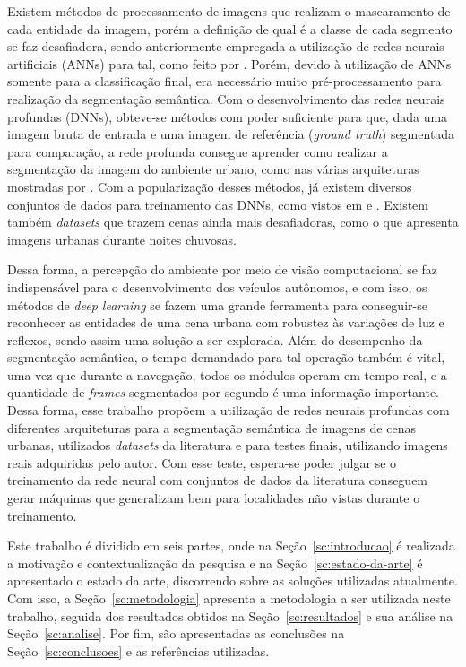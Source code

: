 \documentclass[conference]{IEEEtran}
\begin{document}
Existem métodos de processamento de imagens que realizam o mascaramento de cada entidade da imagem, porém a definição de qual é a classe de cada segmento se faz desafiadora, sendo anteriormente empregada a utilização de redes neurais artificiais (ANNs) para tal, como feito por \cite{vitor20132D3DVision}. Porém, devido à utilização de ANNs somente para a classificação final, era necessário muito pré-processamento para realização da segmentação semântica. Com o desenvolvimento das redes neurais profundas (DNNs), obteve-se métodos com poder suficiente para que, dada uma imagem bruta de entrada e uma imagem de referência (\textit{ground truth}) segmentada para comparação, a rede profunda consegue aprender como realizar a segmentação da imagem do ambiente urbano, como nas várias arquiteturas mostradas por \cite{papadeas2021RealTimeSemanticImage}. Com a popularização desses métodos, já existem diversos conjuntos de dados para treinamento das DNNs, como vistos em \cite{cordts2016CityscapesDatasetSemantic} e \cite{brostow2008SegmentationRecognitionUsing,brostow2009SemanticObjectClasses}. Existem também \textit{datasets} que trazem cenas ainda mais desafiadoras, como o \cite{jin2021RaidaRRichAnnotated} que apresenta imagens urbanas durante noites chuvosas.

Dessa forma, a percepção do ambiente por meio de visão computacional se faz indispensável para o desenvolvimento dos veículos autônomos, e com isso, os métodos de \textit{deep learning} se fazem uma grande ferramenta para conseguir-se reconhecer as entidades de uma cena urbana com robustez às variações de luz e reflexos, sendo assim uma solução a ser explorada. Além do desempenho da segmentação semântica, o tempo demandado para tal operação também é vital, uma vez que durante a navegação, todos os módulos operam em tempo real, e a quantidade de \textit{frames} segmentados por segundo é uma informação importante. Dessa forma, esse trabalho propõem a utilização de redes neurais profundas com diferentes arquiteturas para a segmentação semântica de imagens de cenas urbanas, utilizados \textit{datasets} da literatura e para testes finais, utilizando imagens reais adquiridas pelo autor. Com esse teste, espera-se poder julgar se o treinamento da rede neural com conjuntos de dados da literatura conseguem gerar máquinas que generalizam bem para localidades não vistas durante o treinamento.

Este trabalho é dividido em seis partes, onde na Seção~\ref{sc:introducao} é realizada a motivação e contextualização da pesquisa e na Seção~\ref{sc:estado-da-arte} é apresentado o estado da arte, discorrendo sobre as soluções utilizadas atualmente. Com isso, a Seção~\ref{sc:metodologia} apresenta a metodologia a ser utilizada neste trabalho, seguida dos resultados obtidos na Seção~\ref{sc:resultados} e sua análise na Seção~\ref{sc:analise}. Por fim, são apresentadas as conclusões na Seção~\ref{sc:conclusoes} e as referências utilizadas.
\end{document}
